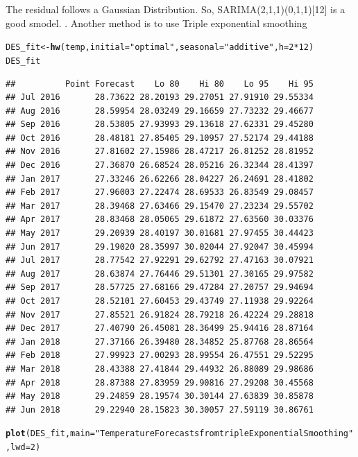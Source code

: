 \documentclass[10pt]{article}\usepackage[]{graphicx}\usepackage[]{color}
\makeatletter
\newcommand{\hlnum}[1]{\textcolor[rgb]{0.686,0.059,0.569}{#1}}%
\newcommand{\hlstr}[1]{\textcolor[rgb]{0.192,0.494,0.8}{#1}}%
\newcommand{\hlopt}[1]{\textcolor[rgb]{0,0,0}{#1}}%
\newcommand{\hlstd}[1]{\textcolor[rgb]{0.345,0.345,0.345}{#1}}%
\newcommand{\hlkwb}[1]{\textcolor[rgb]{0.69,0.353,0.396}{#1}}%
\newcommand{\hlkwc}[1]{\textcolor[rgb]{0.333,0.667,0.333}{#1}}%
\newcommand{\hlkwd}[1]{\textcolor[rgb]{0.737,0.353,0.396}{\textbf{#1}}}%
\newenvironment{kframe}{%
 \def\at@end@of@kframe{}%
 \ifinner\ifhmode%
  \def\at@end@of@kframe{\end{minipage}}%
  \begin{minipage}{\columnwidth}%
 \fi\fi%
 \def\FrameCommand##1{\hskip\@totalleftmargin \hskip-\fboxsep
 \colorbox{shadecolor}{##1}\hskip-\fboxsep
     \hskip-\linewidth \hskip-\@totalleftmargin \hskip\columnwidth}%
 \MakeFramed {\advance\hsize-\width
   \@totalleftmargin\z@ \linewidth\hsize
   \@setminipage}}%
 {\par\unskip\endMakeFramed%
 \at@end@of@kframe}
\newenvironment{knitrout}{}{} %
\makeatother
\begin{document}
The residual follows a Gaussian Distribution.
So, SARIMA(2,1,1)(0,1,1)[12] is a good smodel.
. Another method is to use Triple exponential smoothing
\begin{knitrout}
\color{fgcolor}\begin{kframe}
\begin{alltt}
\hlstd{DES_fit} \hlkwb{<-} \hlkwd{hw}\hlstd{(temp,} \hlkwc{initial} \hlstd{=} \hlstr{"optimal"}\hlstd{,} \hlkwc{seasonal} \hlstd{=} \hlstr{"additive"}\hlstd{,} \hlkwc{h} \hlstd{=} \hlnum{2}\hlopt{*}\hlnum{12}\hlstd{)}
\hlstd{DES_fit}
\end{alltt}
\begin{verbatim}
##          Point Forecast    Lo 80    Hi 80    Lo 95    Hi 95
## Jul 2016       28.73622 28.20193 29.27051 27.91910 29.55334
## Aug 2016       28.59954 28.03249 29.16659 27.73232 29.46677
## Sep 2016       28.53805 27.93993 29.13618 27.62331 29.45280
## Oct 2016       28.48181 27.85405 29.10957 27.52174 29.44188
## Nov 2016       27.81602 27.15986 28.47217 26.81252 28.81952
## Dec 2016       27.36870 26.68524 28.05216 26.32344 28.41397
## Jan 2017       27.33246 26.62266 28.04227 26.24691 28.41802
## Feb 2017       27.96003 27.22474 28.69533 26.83549 29.08457
## Mar 2017       28.39468 27.63466 29.15470 27.23234 29.55702
## Apr 2017       28.83468 28.05065 29.61872 27.63560 30.03376
## May 2017       29.20939 28.40197 30.01681 27.97455 30.44423
## Jun 2017       29.19020 28.35997 30.02044 27.92047 30.45994
## Jul 2017       28.77542 27.92291 29.62792 27.47163 30.07921
## Aug 2017       28.63874 27.76446 29.51301 27.30165 29.97582
## Sep 2017       28.57725 27.68166 29.47284 27.20757 29.94694
## Oct 2017       28.52101 27.60453 29.43749 27.11938 29.92264
## Nov 2017       27.85521 26.91824 28.79218 26.42224 29.28818
## Dec 2017       27.40790 26.45081 28.36499 25.94416 28.87164
## Jan 2018       27.37166 26.39480 28.34852 25.87768 28.86564
## Feb 2018       27.99923 27.00293 28.99554 26.47551 29.52295
## Mar 2018       28.43388 27.41844 29.44932 26.88089 29.98686
## Apr 2018       28.87388 27.83959 29.90816 27.29208 30.45568
## May 2018       29.24859 28.19574 30.30144 27.63839 30.85878
## Jun 2018       29.22940 28.15823 30.30057 27.59119 30.86761
\end{verbatim}
\begin{alltt}
\hlkwd{plot}\hlstd{(DES_fit,}\hlkwc{main} \hlstd{=} \hlstr{"Temperature Forecasts from triple Exponential Smoothing"}\hlstd{,} \hlkwc{lwd} \hlstd{=} \hlnum{2}\hlstd{)}
\end{alltt}

\end{kframe}
\end{knitrout}
\end{document}
